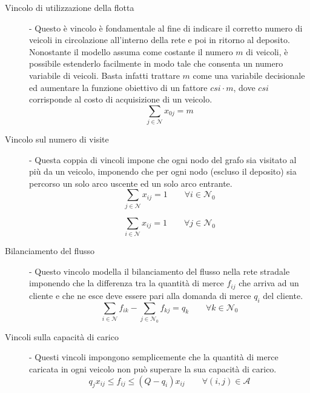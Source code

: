 		\begin{description}
			\item[Vincolo di utilizzazione della flotta]-
				Questo è vincolo è fondamentale al fine di indicare il corretto numero di veicoli in circolazione all’interno della rete e poi in ritorno al deposito. Nonostante il modello assuma come costante il numero $m$ di veicoli, è possibile estenderlo facilmente in modo tale che consenta un numero variabile di veicoli. Basta infatti trattare $m$ come una variabile decisionale ed aumentare la funzione obiettivo di un fattore $csi \cdot m$, dove $csi$ corrisponde al costo di acquisizione di un veicolo.
				\begin{equation}
					\label{eq:fleet_usage}
					\sum_{j \in \mathcal{N}} x_{0j} = m
				\end{equation}

			\item[Vincolo sul numero di visite]-
				Questa coppia di vincoli impone che 	ogni nodo del grafo sia visitato al più da un veicolo, imponendo che per ogni nodo (escluso il deposito) sia percorso un solo arco uscente ed un solo arco entrante.
				\begin{equation}
					\label{eq:single_exit}
					\sum_{j \in \mathcal{N}} x_{ij} = 1 
					\qquad 
					\forall i \in \mathcal{N}_0
				\end{equation}

				\begin{equation}
					\label{eq:single_entrance}
					\sum_{i \in \mathcal{N}} x_{ij} = 1 
					\qquad 
					\forall j \in \mathcal{N}_0
				\end{equation}

			\item[Bilanciamento del flusso]-
				Questo vincolo modella il bilanciamento del flusso nella rete stradale imponendo che la differenza tra la quantità di merce $f_{ij}$ che arriva ad un cliente e che ne esce deve essere pari alla domanda di merce $q_i$ del cliente.
				\begin{equation}
					\label{eq:flux_balance}
					\sum_{i \in \mathcal{N}}f_{ik} - \sum_{j \in \mathcal{N}_0}f_{kj} = q_k  
					\qquad
					\forall k \in \mathcal{N}_0
				\end{equation}

			\item[Vincoli sulla capacità di carico]-
				Questi vincoli impongono semplicemente che la quantità di merce caricata in ogni veicolo non può superare la sua capacità di carico.
				\begin{equation}
					\label{eq:capacity_constraint}
					q_j x_{ij} \leq f_{ij} \leq (Q - q_i)x_{ij} 
					\qquad
					\forall (i,j) \in \mathcal{A} 
				\end{equation}


\end{description}
